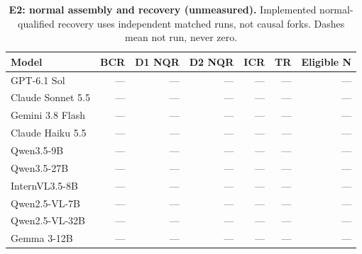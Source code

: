 \begin{table}[!ht]
\centering\small
\caption{\textbf{E2: normal assembly and recovery (unmeasured).} Implemented normal-qualified recovery uses independent matched runs, not causal forks. Dashes mean not run, never zero.}
\begin{tabularx}{\textwidth}{@{}Xrrrrrr@{}}\toprule
Model & BCR & D1 NQR & D2 NQR & ICR & TR & Eligible N\\\midrule
GPT-6.1 Sol & --- & --- & --- & --- & --- & ---\\
Claude Sonnet 5.5 & --- & --- & --- & --- & --- & ---\\
Gemini 3.8 Flash & --- & --- & --- & --- & --- & ---\\
Claude Haiku 5.5 & --- & --- & --- & --- & --- & ---\\
Qwen3.5-9B & --- & --- & --- & --- & --- & ---\\
Qwen3.5-27B & --- & --- & --- & --- & --- & ---\\
InternVL3.5-8B & --- & --- & --- & --- & --- & ---\\
Qwen2.5-VL-7B & --- & --- & --- & --- & --- & ---\\
Qwen2.5-VL-32B & --- & --- & --- & --- & --- & ---\\
Gemma 3-12B & --- & --- & --- & --- & --- & ---\\
\bottomrule
\end{tabularx}
\end{table}

